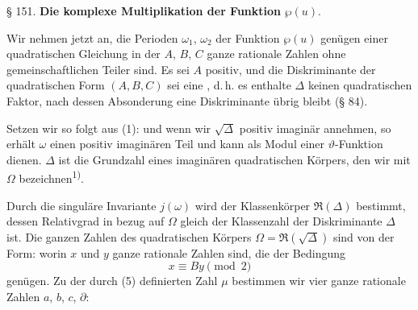 
\begin{center}
§ 151. \textbf{Die komplexe Multiplikation der Funktion} $\wp(u)$.
\end{center}

Wir nehmen jetzt an, die Perioden $\omega_1$, $\omega_2$ der Funktion $\wp(u)$ genügen einer quadratischen Gleichung
in der $A$, $B$, $C$ ganze rationale Zahlen ohne gemeinschaftlichen Teiler sind. Es sei $A$ positiv, und die Diskriminante der quadratischen Form $(A, B, C)$
sei eine , d.\,h. es enthalte $\Delta$ keinen quadratischen Faktor, nach dessen Absonderung eine Diskriminante übrig bleibt (§ 84).

Setzen wir
so folgt aus (1):
und wenn wir $\sqrt{\Delta}$ positiv imaginär annehmen, so erhält $\omega$ einen positiv imaginären Teil und kann als Modul einer $\vartheta$-Funktion dienen. $\Delta$ ist die Grundzahl eines imaginären quadratischen Körpers, den wir mit $\Omega$ bezeichnen\textsuperscript{1)}\begingroup\renewcommand{\thefootnote}{1)}\endgroup.

Durch die singuläre Invariante $j(\omega)$ wird der Klassenkörper $\mathfrak{R}(\Delta)$ bestimmt, dessen Relativgrad in bezug auf $\Omega$ gleich der Klassenzahl der Diskriminante $\Delta$ ist. Die ganzen Zahlen des quadratischen Körpers $\Omega = \mathfrak{R}(\sqrt{\Delta})$ sind von der Form:
worin $x$ und $y$ ganze rationale Zahlen sind, die der Bedingung
\[ x \equiv By \pmod{2} \]
genügen. Zu der durch (5) definierten Zahl $\mu$ bestimmen wir vier ganze rationale Zahlen $a$, $b$, $c$, $\partial$:
